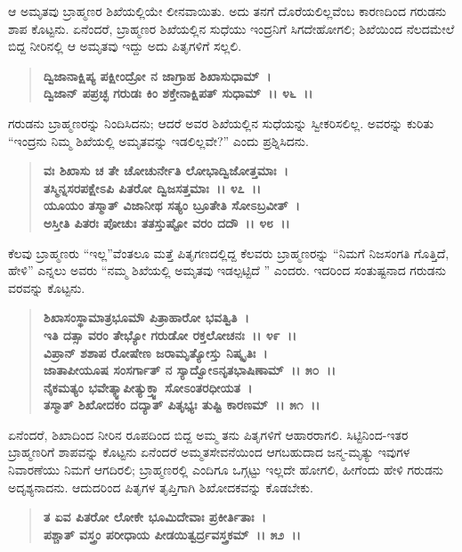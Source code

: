ಆ ಅಮೃತವು ಬ್ರಾಹ್ಮಣರ ಶಿಖೆಯಲ್ಲಿಯೇ ಲೀನವಾಯಿತು. ಅದು ತನಗೆ ದೊರೆಯಲಿಲ್ಲವೆಂಬ ಕಾರಣದಿಂದ ಗರುಡನು ಶಾಪ ಕೊಟ್ಟನು. ಏನೆಂದರೆ, ಬ್ರಾಹ್ಮಣರ ಶಿಖೆಯಲ್ಲಿನ ಸುಧೆಯು ಇಂದ್ರನಿಗೆ ಸಿಗದೇಹೋಗಲಿ; ಶಿಖೆಯಿಂದ ನೆಲದಮೇಲೆ ಬಿದ್ದ ನೀರಿನಲ್ಲಿ ಆ ಅಮೃತವು ಇದ್ದು ಅದು ಪಿತೃಗಳಿಗೆ ಸಲ್ಲಲಿ.

\begin{verse}
\textbf{ದ್ವಿಜಾನಾಕ್ಷಿಪ್ಯ ಪಕ್ಷೀಂದ್ರೋ ನ ಜಾಗ್ರಾಹ ಶಿಖಾಸುಧಾಮ್~।}\\\textbf{ದ್ವಿಜಾನ್ ಪಪ್ರಚ್ಛ ಗರುಡಃ ಕಿಂ ಶಕ್ತೇನಾಕ್ಷಿಪತ್ ಸುಧಾಮ್~।। ೪೬~।।}
\end{verse}

ಗರುಡನು ಬ್ರಾಹ್ಮಣರನ್ನು ನಿಂದಿಸಿದನು; ಆದರೆ ಅವರ ಶಿಖೆಯಲ್ಲಿನ ಸುಧೆಯನ್ನು ಸ್ವೀಕರಿಸಲಿಲ್ಲ. ಅವರನ್ನು ಕುರಿತು “ಇಂದ್ರನು ನಿಮ್ಮ ಶಿಖೆಯಲ್ಲಿ ಅಮೃತವನ್ನು ಇಡಲಿಲ್ಲವೇ?” ಎಂದು ಪ್ರಶ್ನಿಸಿದನು.

\begin{verse}
\textbf{ವಃ ಶಿಖಾಸು ಚ ತೇ ಚೋಚುರ್ನೇತಿ ಲೋಭಾದ್ವಿಜೋತ್ತಮಾಃ~।}\\\textbf{ತಸ್ಮಿನ್ನಸರಪಕ್ಷೇಽಪಿ ಪಿತರೋ ದ್ವಿಜಸತ್ತಮಾಃ~।। ೪೭~।।}\\\textbf{ಯೂಯಂ ತಸ್ಮಾತ್ ವಿಜಾನೀಥ ಸತ್ಯಂ ಬ್ರೂತೇತಿ ಸೋಽಬ್ರವೀತ್~।}\\\textbf{ಅಸ್ತೀತಿ ಪಿತರಃ ಪೋಚುಃ ತತಸ್ತುಷ್ಟೋ ವರಂ ದದೌ~।। ೪೮~।।}
\end{verse}

ಕೆಲವು ಬ್ರಾಹ್ಮಣರು “ಇಲ್ಲ”ವೆಂತಲೂ ಮತ್ತೆ ಪಿತೃಗಣದಲ್ಲಿದ್ದ ಕೆಲವರು ಬ್ರಾಹ್ಮಣರನ್ನು “ನಿಮಗೆ ನಿಜಸಂಗತಿ ಗೊತ್ತಿದೆ, ಹೇಳಿ” ಎನ್ನಲು ಅವರು “ನಮ್ಮ ಶಿಖೆಯಲ್ಲಿ ಅಮೃತವು ಇಡಲ್ಪಟ್ಟಿದೆ ” ಎಂದರು. ಇದರಿಂದ ಸಂತುಷ್ಟನಾದ ಗರುಡನು ವರವನ್ನು ಕೊಟ್ಟನು.

\begin{verse}
\textbf{ಶಿಖಾಸಂಸ್ಥಾಮಾತ್ರಭೂಮೌ ಪಿತ್ರಾಹಾರೋ ಭವತ್ವಿತಿ~।}\\\textbf{ಇತಿ ದತ್ಸಾ ವರಂ ತೇಭ್ಯೋ ಗರುಡೋ ರಕ್ತಲೋಚನಃ~।। ೪೯~।।}\\\textbf{ವಿಪ್ರಾನ್ ಶಶಾಪ ರೋಷೇಣ ಜರಾಮೃತ್ಯೋಸ್ತು ನಿಷ್ಕೃತಿಃ~।}\\\textbf{ಜಾತಾಪೀಯೂಷ ಸಂಸರ್ಗಾತ್ ನ ಸ್ಯಾದ್ವೋಽನೃತಭಾಷಿಣಾಮ್~।। ೫೦~।।}\\\textbf{ನೈಕಮತ್ಯಂ ಭವೇತ್ಕ್ವಾಪೀತ್ಯುಕ್ತ್ವಾ ಸೋಽಂತರಧೀಯತ~।}\\\textbf{ತಸ್ಮಾತ್ ಶಿಖೋದಕಂ ದದ್ಯಾತ್ ಪಿತೃಭ್ಯಃ ತುಷ್ಟಿ ಕಾರಣಮ್~।। ೫೧~।।}
\end{verse}

ಏನೆಂದರೆ, ಶಿಖಾದಿಂದ ನೀರಿನ ರೂಪದಿಂದ ಬಿದ್ದ ಅಮ್ಮ ತನು ಪಿತೃಗಳಿಗೆ ಆಹಾರರಾಗಲಿ. ಸಿಟ್ಟಿನಿಂದ-ಇತರ ಬ್ರಾಹ್ಮಣರಿಗೆ ಶಾಪವನ್ನು ಕೊಟ್ಟನು ಏನೆಂದರೆ ಅಮ್ಮತಸೇವನೆಯಿಂದ ಆಗಬಹುದಾದ ಜನ್ಮ-ಮೃತ್ಯು ಇವುಗಳ ನಿವಾರಣೆಯು ನಿಮಗೆ ಆಗದಿರಲಿ; ಬ್ರಾಹ್ಮಣರಲ್ಲಿ ಎಂದಿಗೂ ಒಗ್ಗಟ್ಟು ಇಲ್ಲದೇ ಹೋಗಲಿ, ಹೀಗೆಂದು ಹೇಳಿ ಗರುಡನು ಅದೃಶ್ಯನಾದನು. ಆದುದರಿಂದ ಪಿತೃಗಳ ತೃಪ್ತಿಗಾಗಿ ಶಿಖೋದಕವನ್ನು ಕೊಡಬೇಕು.

\begin{verse}
\textbf{ತ ಏವ ಪಿತರೋ ಲೋಕೇ ಭೂಮಿದೇವಾಃ ಪ್ರಕೀರ್ತಿತಾಃ~।}\\\textbf{ಪಶ್ಚಾತ್ ವಸ್ತ್ರಂ ಪರೀಧಾಯ ಪೀಡಯಿತ್ವರ್ದ್ರವಸ್ತ್ರಕಮ್~।। ೫೨~।।}
\end{verse}

